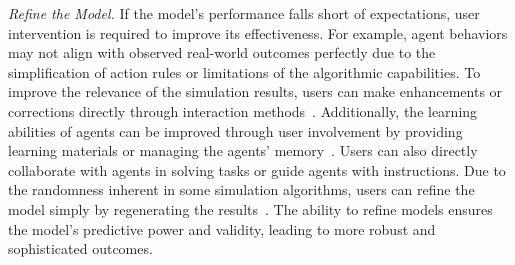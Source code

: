 
\textit{Refine the Model.}
If the model's performance falls short of expectations, user intervention is required to improve its effectiveness.
For example, agent behaviors may not align with observed real-world outcomes perfectly due to the simplification of action rules or limitations of the algorithmic capabilities.
To improve the relevance of the simulation results, users can make enhancements or corrections directly through interaction methods~\cite{mandi2023rocodialecticmultirobotcollaboration}.
Additionally, the learning abilities of agents can be improved through user involvement by providing learning materials or managing the agents' 
memory~\cite{jin2024surrealdriverdesigningllmpoweredgenerative,unknown}.
Users can also directly collaborate with agents in solving tasks or guide agents with instructions\cite{mohanty2023transforminghumancenteredaicollaboration,zhang2024buildingcooperativeembodiedagents}.
Due to the randomness inherent in some simulation algorithms, users can refine the model simply by regenerating the results~\cite{10.1145/3526113.3545616}.
The ability to refine models ensures the model's predictive power and validity, leading to more robust and sophisticated outcomes.

